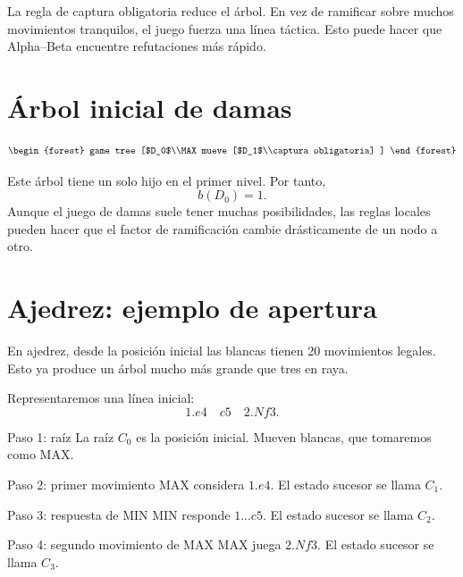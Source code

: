\begin{intuitionbox}
La regla de captura obligatoria reduce el árbol. En vez de ramificar sobre muchos movimientos tranquilos, el juego fuerza una línea táctica. Esto puede hacer que Alpha--Beta encuentre refutaciones más rápido.
\end{intuitionbox}

\section{Árbol inicial de damas}

\[
\begin{forest}
game tree
[$D_0$\\MAX mueve
  [$D_1$\\captura obligatoria]
]
\end{forest}
\]

Este árbol tiene un solo hijo en el primer nivel. Por tanto,
\[
 b(D_0)=1.
\]
Aunque el juego de damas suele tener muchas posibilidades, las reglas locales pueden hacer que el factor de ramificación cambie drásticamente de un nodo a otro.

\section{Ajedrez: ejemplo de apertura}

En ajedrez, desde la posición inicial las blancas tienen 20 movimientos legales. Esto ya produce un árbol mucho más grande que tres en raya.

Representaremos una línea inicial:
\[
1.e4\quad c5\quad 2.Nf3.
\]

\begin{stepbox}{Paso 1: raíz}
La raíz $C_0$ es la posición inicial. Mueven blancas, que tomaremos como MAX.
\end{stepbox}

\begin{stepbox}{Paso 2: primer movimiento}
MAX considera $1.e4$. El estado sucesor se llama $C_1$.
\end{stepbox}

\begin{stepbox}{Paso 3: respuesta de MIN}
MIN responde $1...c5$. El estado sucesor se llama $C_2$.
\end{stepbox}

\begin{stepbox}{Paso 4: segundo movimiento de MAX}
MAX juega $2.Nf3$. El estado sucesor se llama $C_3$.
\end{stepbox}

